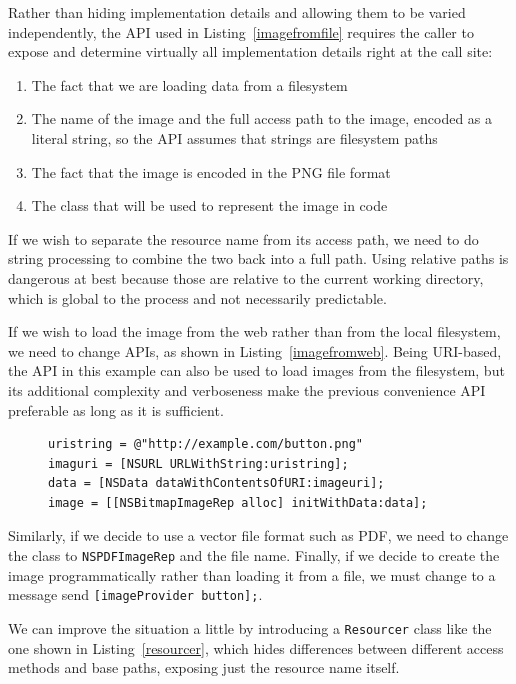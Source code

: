 \documentclass[preprint]{sigplanconf}
\begin{document}
Rather than hiding implementation details and allowing
 them to be varied independently, the API used in Listing~\ref{imagefromfile} requires the caller
to expose and determine virtually all implementation details right at the call site:

\begin{enumerate} 
\item The fact that we are loading data from a filesystem
\item The name of the image and the full access path to the image, encoded as a literal string, so
	the API assumes that strings are filesystem paths
\item The fact that the image is encoded in the PNG file format
\item The class that will be used to represent the image in code
\end{enumerate}

If we wish to separate the resource name from its access path, we need to do string 
processing to combine the two back into a full path.  Using relative paths is dangerous
at best because those are relative to the current working directory, which is global to
the process and not necessarily predictable.

If we wish to load the image from the web rather than from the local filesystem, we need to
change APIs, as shown in Listing~\ref{imagefromweb}.  Being URI-based, the
API in this example can also be used to load images from the filesystem, but its additional
complexity and verboseness make the previous convenience API preferable as long as
it is sufficient.

\begin{figure}[htbp]
\begin{lstlisting}[style=numbers,label=imagefromweb,caption=Loading image from web]
uristring = @"http://example.com/button.png"
imaguri = [NSURL URLWithString:uristring];
data = [NSData dataWithContentsOfURI:imageuri];
image = [[NSBitmapImageRep alloc] initWithData:data];
\end{lstlisting}
\end{figure}

Similarly, if we decide to use a vector file format such as PDF, we need to change the
class to {\tt NSPDFImageRep} and the file name.  Finally, if we decide to create the
image programmatically rather than loading it from a file, we must change to 
a message send {\tt [imageProvider button];}.

We can improve the situation a little by introducing a {\tt Resourcer} class like the
one shown in Listing~\ref{resourcer}, which hides differences between different
access methods and base paths, exposing just the resource name itself. 
\end{document}
